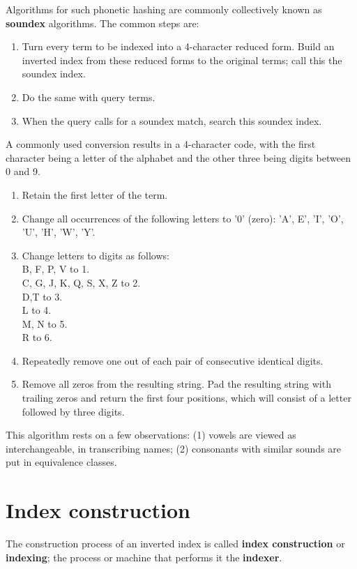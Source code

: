 \documentclass[letterpaper,11pt]{article}
\begin{document}
Algorithms for such phonetic hashing are commonly collectively known as \textbf{soundex} algorithms. The common steps are:
\begin{enumerate}
    \item Turn every term to be indexed into a 4-character reduced form. Build an inverted index from these reduced forms to the original terms; call this the soundex index.
    \item Do the same with query terms.
    \item When the query calls for a soundex match, search this soundex index.
\end{enumerate}
A commonly used conversion results in a 4-character code, with the first character being a letter of the alphabet and the other three being digits between 0 and 9.
\begin{enumerate}
    \item Retain the first letter of the term.
    \item Change all occurrences of the following letters to ’0’ (zero): ’A’, E’, ’I’, ’O’,
’U’, ’H’, ’W’, ’Y’.
    \item Change letters to digits as follows: \\ 
    \indent B, F, P, V to 1.\\ 
    \indent C, G, J, K, Q, S, X, Z to 2.\\ 
    \indent D,T to 3.\\ 
    \indent L to 4.\\ 
    \indent M, N to 5.\\
    \indent R to 6.
    \item Repeatedly remove one out of each pair of consecutive identical digits.
    \item Remove all zeros from the resulting string. Pad the resulting string with trailing zeros and return the first four positions, which will consist of a letter followed by three digits.
\end{enumerate}
This algorithm rests on a few observations: (1) vowels are viewed as interchangeable, in transcribing names; (2) consonants with similar sounds are put in equivalence classes.

\section{Index construction}
The construction process of an inverted index is called \textbf{index construction} or \textbf{indexing}; the process or machine that performs it the \textbf{indexer}.
\end{document}
